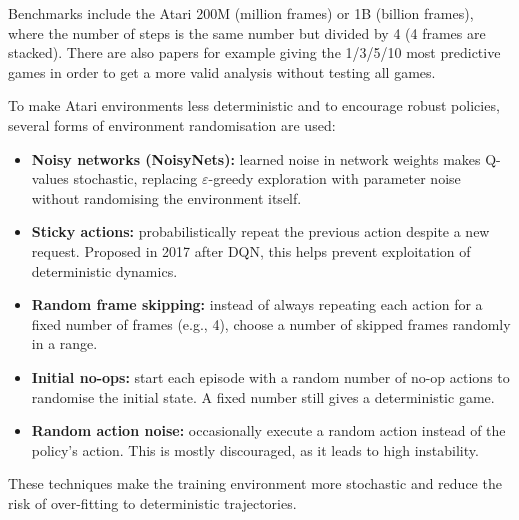 \documentclass[11pt,a4paper]{article}
\begin{document}
Benchmarks include the Atari 200M (million frames) or 1B (billion frames),
where the number of steps is the same number but divided by 4 (4 frames are
stacked). There are also papers for example giving the 1/3/5/10 most predictive games in
order to get a more valid analysis without testing all games.

To make Atari environments less deterministic and to encourage robust policies,
several forms of environment randomisation are used:
\begin{itemize}
 \item \textbf{Noisy networks (NoisyNets):} learned noise in network weights
 makes Q-values stochastic, replacing $\varepsilon$-greedy exploration with
 parameter noise without randomising the environment itself.
 \item \textbf{Sticky actions:} probabilistically repeat the previous action
 despite a new request. Proposed in 2017 after DQN, this helps prevent
 exploitation of deterministic dynamics.
 \item \textbf{Random frame skipping:} instead of always repeating each
 action for a fixed number of frames (e.g., 4), choose a number of skipped
 frames randomly in a range.
 \item \textbf{Initial no-ops:} start each episode with a random number of
 no-op actions to randomise the initial state. A fixed number still gives a deterministic game.
 \item \textbf{Random action noise:} occasionally execute a random action
 instead of the policy's action. This is mostly discouraged, as it leads to high
 instability.
\end{itemize}
These techniques make the training environment more stochastic and reduce
the risk of over-fitting to deterministic trajectories.
\end{document}
